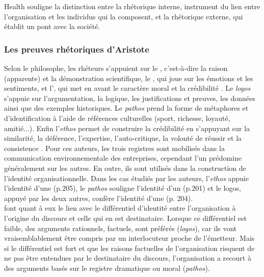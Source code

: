             Health souligne la distinction entre la rhétorique interne, instrument du lien entre l'organisation et les individus qui la composent, et la rhétorique externe, qui établit un pont avec la société.

        \subsubsection{Les preuves rhétoriques d'Aristote}
            Selon le philosophe, les rhéteurs s'appuient sur le , c'est-à-dire la raison (apparente) et la démonstration scientifique, le , qui joue sur les émotions et les sentiments, et l', qui met en avant le caractère moral et la crédibilité \parencite{higgins2012ethos}. Le \textit{logos} s'appuie sur l'argumentation, la logique, les justifications et preuves, les données ainsi que des exemples historiques. Le \textit{pathos} prend la forme de métaphores et d'identification à l'aide de références culturelles (sport, richesse, loyauté, amitié...). Enfin l'\textit{ethos} permet de construire la crédibilité en s'appuyant sur la similarité, la déférence, l'expertise, l'auto-critique, la volonté de réussir et la consistence \parencite[][p.198]{higgins2012ethos}. Pour ces auteurs, les trois registres sont mobilisés dans la communication environnementale des entreprises, cependant l'un prédomine généralement sur les autres. En outre, ils sont utilisés dans la construction de l'identité organisationnelle. Dans les cas étudiés par les auteurs, l'\textit{ethos} appuie l'identité d'une  (p.205), le \textit{pathos} souligne l'identité d'un  (p.201) et le logos, appuyé par les deux autres, confère l'identité d'une  (p. 204). \\

            \textcite{waldron2016how} font quant à eux le lien avec le différentiel d'identité entre l'organisation à l'origine du discours et celle qui en est destinataire. Lorsque ce différentiel est faible, des arguments rationnels, factuels, sont préférés (\textit{logos}), car ils vont vraisemblablement être compris par un interlocuteur proche de l'émetteur. Mais si le différentiel est fort et que les raisons factuelles de l'organisation risquent de ne pas être entendues par le destinataire du discours, l'organisation a recourt à des arguments basés sur le registre dramatique ou moral (\textit{pathos}). \\

